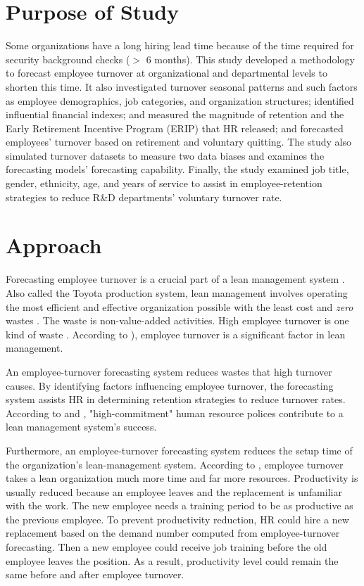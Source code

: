 \section{Purpose of Study}
Some organizations have a long hiring lead time because of the time required for security background checks ($>$ 6 months). This study developed a methodology to forecast employee turnover at organizational and departmental levels to shorten this time. It also investigated turnover seasonal patterns and such factors as employee demographics, job categories, and organization structures; identified influential financial indexes; and measured the magnitude of retention and the Early Retirement Incentive Program (ERIP) \citep{ERIP} that HR released; and forecasted employees' turnover based on retirement and voluntary quitting. The study also simulated turnover datasets to measure two data biases and examines the forecasting models' forecasting capability. Finally, the study examined job title, gender, ethnicity, age, and years of service to assist in employee-retention strategies to reduce R\&D departments' voluntary turnover rate. 
\section{Approach}
Forecasting employee turnover is a crucial part of a lean management system \citep{allway2002}. Also called the Toyota production system, lean management involves operating the most efficient and effective organization possible with the least cost and {\it zero} wastes \citep{jackson1996}. The waste is non-value-added activities. High employee turnover is one kind of waste \citep{kilpatrick2003}. According to \citet{allway2002} ), employee turnover is a significant factor in lean management. 

An employee-turnover forecasting system reduces wastes that high turnover causes. By identifying factors influencing employee turnover, the forecasting system assists HR in determining retention strategies to reduce turnover rates. According to \citet{yeung1997} and \citet{kochan1992}, "high-commitment" human resource polices contribute to a lean management system's success.

Furthermore, an employee-turnover forecasting system reduces the setup time of the organization's lean-management system. According to \citet{lin1999}, employee turnover takes a lean organization much more time and far more resources. Productivity is usually reduced because an employee leaves and the replacement is unfamiliar with the work. The new employee needs a training period to be as productive as the previous employee. To prevent productivity reduction, HR could hire a new replacement based on the demand number computed from employee-turnover forecasting. Then a new employee could receive job training before the old employee leaves the position. As a result, productivity level could remain the same before and after employee turnover.  

